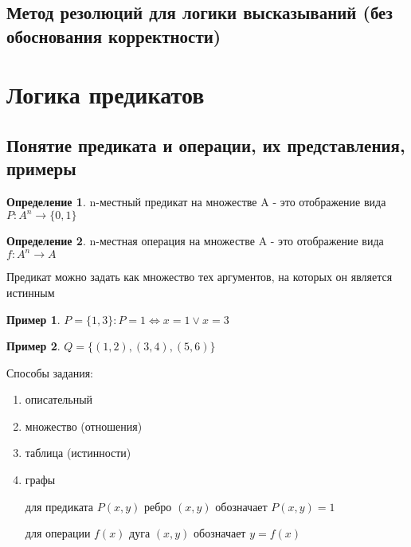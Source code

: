 \documentclass[a4paper]{article}
\theoremstyle{definition}
\newtheorem*{example}{Пример}
\newtheorem*{definition}{Определение}
\theoremstyle{remark}
\begin{document}
    \subsection{Метод резолюций для логики высказываний (без обоснования корректности)}
    \section{Логика предикатов}
    \subsection{Понятие предиката и операции, их представления, примеры}
    \begin{definition}
        n-местный предикат на множестве A - это отображение вида $P: A^n \rightarrow \{0, 1\}$ 
    \end{definition}
    \begin{definition}
        n-местная операция на множестве A - это отображение вида $f: A^n \rightarrow A$ 
    \end{definition}
    Предикат можно задать как множество тех аргументов, на которых он является истинным
    \begin{example}
        $P = \{1, 3\} : P = 1 \Leftrightarrow x = 1 \vee x = 3$
    \end{example}
    \begin{example}
        $Q = \{(1, 2), (3, 4), (5, 6)\}$
    \end{example}
    Способы задания:
    \begin{enumerate}
        \item описательный
        \item множество (отношения)
        \item таблица (истинности)
        \item графы 
        
        для предиката $P(x, y)$ ребро $(x, y)$ обозначает $P(x,y) = 1$

        для операции $f(x)$ дуга $(x, y)$ обозначает $y = f(x)$
    \end{enumerate}
\end{document}
